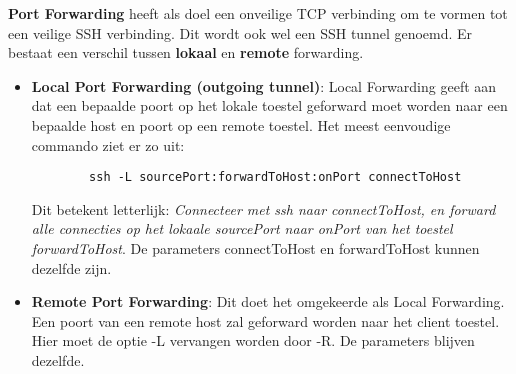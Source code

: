 	\textbf{Port Forwarding} heeft als doel een onveilige TCP verbinding om te vormen tot een veilige SSH verbinding. Dit wordt ook wel een SSH tunnel genoemd. Er bestaat een verschil tussen \textbf{lokaal} en \textbf{remote} forwarding. 
	\begin{itemize}
		\item \textbf{Local Port Forwarding (outgoing tunnel)}: Local Forwarding geeft aan dat een bepaalde poort op het lokale toestel geforward moet worden naar een bepaalde host en poort op een remote toestel. Het meest eenvoudige commando ziet er zo uit:
		\begin{lstlisting}
		ssh -L sourcePort:forwardToHost:onPort connectToHost
		\end{lstlisting}
		Dit betekent letterlijk: \textit{Connecteer met ssh naar connectToHost, en forward alle connecties op het lokaale sourcePort naar onPort van het toestel forwardToHost}. De parameters connectToHost en forwardToHost kunnen dezelfde zijn.	
		
		\item \textbf{Remote Port Forwarding}: Dit doet het omgekeerde als Local Forwarding. Een poort van een remote host zal geforward worden naar het client toestel. Hier moet de optie -L vervangen worden door -R. De parameters blijven dezelfde.
	\end{itemize}